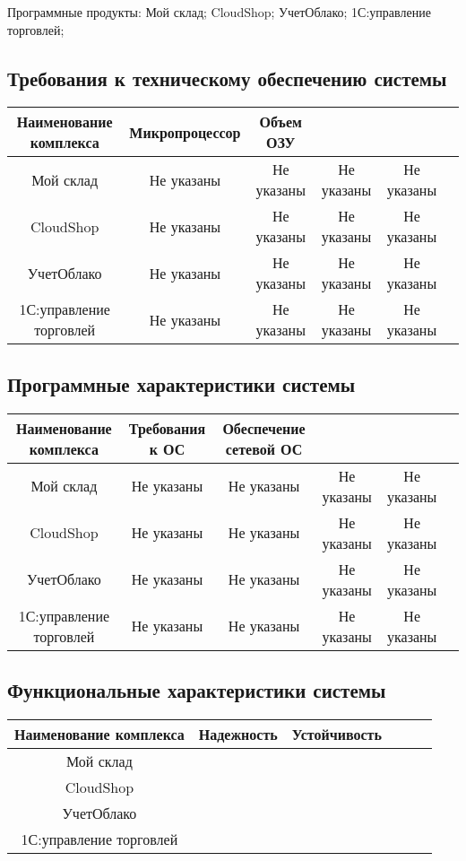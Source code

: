 \documentclass[14pt]{extarticle}
\begin{document}
Программные продукты: Мой склад; CloudShop; УчетОблако; 1С:управление торговлей;

\subsection{Требования к техническому обеспечению системы}

\begin{tabular}{|c|c|c|c|c|c|}
	\hline
	Наименование комплекса & Микропроцессор & Объем ОЗУ & & & \\ \hline
	Мой склад & Не указаны & Не указаны & Не указаны & Не указаны & \\ \hline
	CloudShop & Не указаны & Не указаны & Не указаны & Не указаны & \\ \hline
	УчетОблако & Не указаны & Не указаны & Не указаны & Не указаны & \\ \hline
	1С:управление торговлей & Не указаны & Не указаны & Не указаны & Не указаны & \\ \hline
\end{tabular}

\subsection{Программные  характеристики системы}

\begin{tabular}{|c|c|c|c|c|c|}
	\hline
	Наименование комплекса & Требования к ОС & Обеспечение сетевой ОС &  & & \\ \hline
	Мой склад & Не указаны & Не указаны & Не указаны & Не указаны & \\ \hline
	CloudShop & Не указаны & Не указаны & Не указаны & Не указаны & \\ \hline
	УчетОблако & Не указаны & Не указаны & Не указаны & Не указаны & \\ \hline
	1С:управление торговлей & Не указаны & Не указаны & Не указаны & Не указаны & \\ \hline
\end{tabular}

\subsection{Функциональные  характеристики системы}

\begin{tabular}{|c|c|c|c|c|c|}
	\hline
	Наименование комплекса & Надежность & Устойчивость &  & & \\ \hline
	Мой склад &  &  &  & & \\ \hline
	CloudShop &  &  &  & & \\ \hline
	УчетОблако &  &  &  & & \\ \hline
	1С:управление торговлей &  &  &  & & \\ \hline
\end{tabular}
\end{document}
